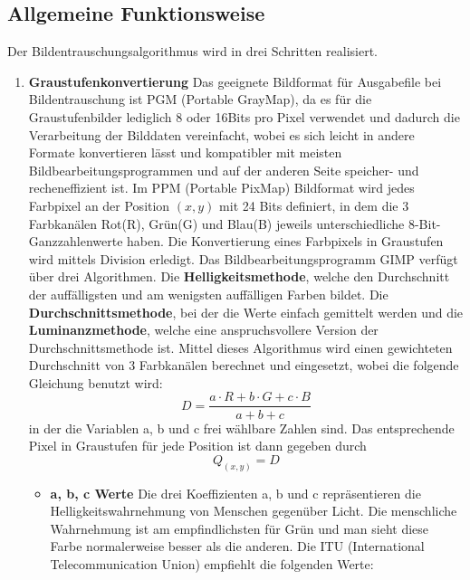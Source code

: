 \documentclass[course=erap]{aspdoc}
\begin{document}
\subsection{Allgemeine Funktionsweise}

Der Bildentrauschungsalgorithmus wird in drei Schritten realisiert. 
\begin{enumerate}
    \item\textbf{Graustufenkonvertierung} \newline
    Das geeignete Bildformat für Ausgabefile bei Bildentrauschung ist PGM (Portable GrayMap), da es  für die Graustufenbilder lediglich 8 oder 16Bits pro Pixel verwendet und dadurch die Verarbeitung der Bilddaten vereinfacht, wobei es sich leicht in andere Formate  konvertieren lässt und kompatibler mit meisten Bildbearbeitungsprogrammen und auf der anderen Seite speicher- und recheneffizient ist. 
    Im PPM (Portable PixMap) Bildformat wird jedes Farbpixel an der Position $(x,y)$ mit 24 Bits definiert, in dem die 3 Farbkanälen Rot(R), Grün(G) und Blau(B) jeweils unterschiedliche 8-Bit-Ganzzahlenwerte haben.
    \newline
    Die Konvertierung eines Farbpixels in Graustufen wird mittels Division erledigt. 
    \newline
    Das Bildbearbeitungsprogramm GIMP verfügt über drei Algorithmen. \newline
    Die \textbf{Helligkeitsmethode}, welche den Durchschnitt der auffälligsten und am wenigsten auffälligen Farben bildet. %
    Die \textbf{Durchschnittsmethode}, bei der die Werte einfach gemittelt werden %
    und die \textbf{Luminanzmethode}, welche eine anspruchsvollere Version der Durchschnittsmethode ist.
    Mittel dieses Algorithmus wird einen gewichteten Durchschnitt von 3 Farbkanälen berechnet und eingesetzt, wobei die folgende Gleichung benutzt wird:
        $$ D = \frac{a\cdot R + b\cdot G + c\cdot B}{a + b + c}   $$
     in der die Variablen a, b und c frei wählbare Zahlen sind.\newline
     Das entsprechende Pixel in Graustufen für jede Position ist dann gegeben durch $$ Q_{(x, y)} = D $$
\begin{itemize}
   \item\textbf{a, b, c Werte} \newline 
    Die drei Koeffizienten a, b und c repräsentieren die Helligkeitswahrnehmung von Menschen gegenüber Licht. Die menschliche Wahrnehmung ist am empfindlichsten für Grün und man sieht diese Farbe normalerweise besser als die anderen. Die ITU (International Telecommunication Union) empfiehlt die folgenden Werte\cite{grayscaleCoeff}:

\end{itemize}
\end{enumerate}
\end{document}
